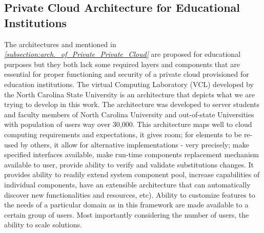 \subsection{Private Cloud Architecture for Educational Institutions}
The architectures \cite{zheng2011design} and \cite{dong2009bluesky} mentioned in \textit{\ref{subsection:arch._of_Private_Private_Cloud}} are proposed for educational purposes but they both lack some required layers and components that are essential for proper functioning and security of a private cloud provisioned for education institutions. The virtual Computing Laboratory (VCL) \cite{vouk2008powered} developed by the North Carolina State University is an architecture that depicts what we are trying to develop in this work. The architecture was developed to server students and faculty members of North Carolina University and out-of-state Universities with population of users way over 30,000. This architecture maps well to cloud computing requirements and expectations, it gives room; for elements to be re-used by others, it allow for alternative implementations - very precisely; make specified interfaces available, make run-time components replacement mechanism available to user, provide ability to verify and validate substitutions changes. It provides ability to readily extend system component pool, increase capabilities of individual  components, have an extensible architecture that can automatically discover new functionalities and resources, etc). Ability to customize features to the needs of a particular domain as in this framework are made available to a certain group of users. Most importantly considering the number of users, the ability to scale solutions.

